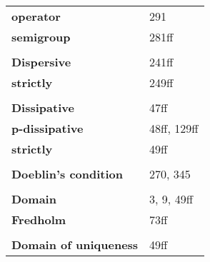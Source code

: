 \documentclass[10pt]{scrartcl}
\begin{document}
\begin{longtable}{>{\bfseries}p{6cm}p{8cm}}
\quad operator & 291 \\
\quad semigroup & 281ff \\
\\
\textbf{Dispersive} & 241ff \\
\quad strictly & 249ff \\
\\
\textbf{Dissipative} & 47ff \\
\quad p-dissipative & 48ff, 129ff \\
\quad strictly & 49ff \\
\\
\textbf{Doeblin's condition} & 270, 345 \\
\\
\textbf{Domain} & 3, 9, 49ff \\
\quad Fredholm & 73ff \\
\\
\textbf{Domain of uniqueness} & 49ff \\

\end{longtable}
\end{document}
